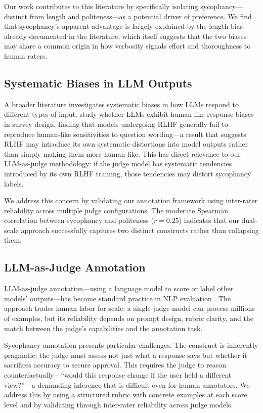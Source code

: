 \documentclass[11pt,twocolumn,a4paper]{article}
\begin{document}
Our work contributes to this literature by specifically isolating
sycophancy---distinct from length and politeness---as a potential
driver of preference. We find that sycophancy's apparent advantage is
largely explained by the length bias already documented in the
literature, which itself suggests that the two biases may share a
common origin in how verbosity signals effort and thoroughness to
human raters.

\subsection{Systematic Biases in LLM Outputs}

A broader literature investigates systematic biases in how LLMs respond
to different types of input. \citet{tjuatja2024llms} study whether
LLMs exhibit human-like response biases in survey design, finding that
models undergoing RLHF generally fail to reproduce human-like
sensitivities to question wording---a result that suggests RLHF may
introduce its own systematic distortions into model outputs rather
than simply making them more human-like. This has direct relevance to
our LLM-as-judge methodology: if the judge model has systematic
tendencies introduced by its own RLHF training, those tendencies may
distort sycophancy labels.

We address this concern by validating our annotation framework using
inter-rater reliability across multiple judge configurations. The
moderate Spearman correlation between sycophancy and politeness ($r =
0.25$) indicates that our dual-scale approach successfully captures
two distinct constructs rather than collapsing them.

\subsection{LLM-as-Judge Annotation}

LLM-as-judge annotation---using a language model to score or
label other models' outputs---has become standard practice in NLP
evaluation \citep{zheng2023judging}. The approach trades human labor
for scale: a single judge model can process millions of examples, but
its reliability depends on prompt design, rubric clarity, and the
match between the judge's capabilities and the annotation task.

Sycophancy annotation presents particular challenges. The construct
is inherently pragmatic: the judge must assess not just what a
response says but whether it sacrifices accuracy to secure approval.
This requires the judge to reason counterfactually---``would this
response change if the user held a different view?''---a demanding
inference that is difficult even for human annotators. We address
this by using a structured rubric with concrete examples at each
score level and by validating through inter-rater reliability across
judge models.
\end{document}
